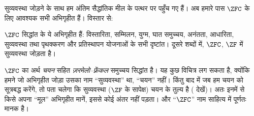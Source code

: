 \documentclass[../../../include/open-logic-section]{subfiles}
\begin{document}

सुव्यवस्था जोड़ने के साथ हम अंतिम सैद्धांतिक मील के पत्थर पर पहुँच गए हैं।
अब हमारे पास $\ZFC$ के लिए आवश्यक सभी अभिगृहीत हैं। विस्तार से:

\begin{defn}
$\ZFC$ सिद्धांत के ये अभिगृहीत हैं: विस्तारिता, सम्मिलन, युग्म, घात
समुच्चय, अनंतता, आधारिता, सुव्यवस्था तथा पृथक्करण और प्रतिस्थापन योजनाओं के
सभी दृष्टांत। दूसरे शब्दों में, $\ZFC$, $\ZF$ में सुव्यवस्था जोड़ता है।
\end{defn}

$\ZFC$ का अर्थ \emph{चयन} सहित \emph{ज़रमेलो--फ़्रेंकल} समुच्चय सिद्धांत
है। यह कुछ विचित्र लग सकता है, क्योंकि हमने जो अभिगृहीत जोड़ा उसका नाम
``सुव्यवस्था'' था, ``चयन'' नहीं। किंतु बाद में जब हम {चयन} को सूत्रबद्ध
करेंगे, तो पता चलेगा कि सुव्यवस्था ($\ZF$ के सापेक्ष) चयन के तुल्य है
( देखें)। अतः इनमें से किसे अपना
``मूल'' अभिगृहीत मानें, इससे कोई अंतर नहीं पड़ता। और ``$\ZFC$'' नाम साहित्य
में पूर्णतः मानक है।
\end{document}
